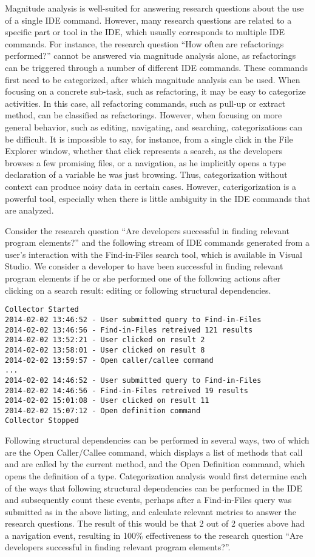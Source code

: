 Magnitude analysis is well-suited for answering research questions about the use of a single IDE command. However, many research questions are related to a specific part or tool in the IDE, which usually corresponds to multiple IDE commands. For instance, the research question ``How often are refactorings performed?'' cannot be answered via magnitude analysis alone, as refactorings can be triggered through a number of different IDE commands. These commands first need to be categorized, after which magnitude analysis can be used. When focusing on a concrete sub-task, such as refactoring, it may be easy to categorize activities. In this case, all refactoring commands, such as pull-up or extract method, can be classified as refactorings. However, when focusing on more general behavior, such as editing, navigating, and searching, categorizations can be difficult. It is impossible to say, for instance, from a single click in the File Explorer window, whether that click represents a search, as the developers browses a few promising files, or a navigation, as he implicitly opens a type declaration of a variable he was just browsing. Thus, categorization without context can produce noisy data in certain cases. However, caterigorization is a powerful tool, especially when there is little ambiguity in the IDE commands that are analyzed.


Consider the research question ``Are developers successful in finding relevant program elements?'' and the following stream of IDE commands generated from a user's interaction with the Find-in-Files search tool, which is available in Visual Studio. We consider a developer to have been successful in finding relevant program elements if he or she performed one of the following actions after clicking on a search result: editing or following structural dependencies.

\begin{verbatim}
Collector Started
2014-02-02 13:46:52 - User submitted query to Find-in-Files
2014-02-02 13:46:56 - Find-in-Files retreived 121 results
2014-02-02 13:52:21 - User clicked on result 2
2014-02-02 13:58:01 - User clicked on result 8
2014-02-02 13:59:57 - Open caller/callee command 
...
2014-02-02 14:46:52 - User submitted query to Find-in-Files
2014-02-02 14:46:56 - Find-in-Files retreived 19 results
2014-02-02 15:01:08 - User clicked on result 11
2014-02-02 15:07:12 - Open definition command
Collector Stopped
\end{verbatim}

Following structural dependencies can be performed in several ways, two of which are the Open Caller/Callee command, which displays a list of methods that call and are called by the current method, and the Open Definition command, which opens the definition of a type. Categorization analysis would first determine each of the ways that following structural dependencies can be performed in the IDE and subsequently count these events, perhaps after a
Find-in-Files query was submitted as in the above listing, and calculate relevant metrics to answer the research questions. The result of this would be that 2 out of 2 queries above had a navigation event, resulting in 100\% effectiveness to the research question ``Are developers successful in finding relevant program elements?''.

